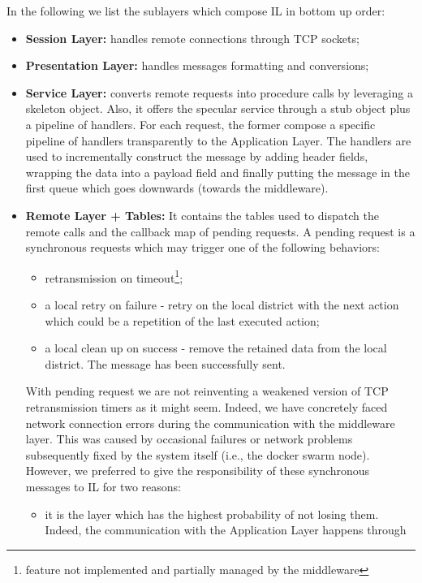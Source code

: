 In the following we list the sublayers which compose IL in
bottom up order:

\begin{itemize}
  \item \textbf{Session Layer:}
  handles remote connections through TCP sockets;
  \item \textbf{Presentation Layer:}
  handles messages formatting and conversions;
  \item \textbf{Service Layer:}
  converts remote requests into procedure calls
  by leveraging a skeleton object.
  Also, it offers the specular service through a stub object plus a pipeline
  of handlers. For each request, the former compose a specific pipeline
  of handlers transparently to the Application Layer.
  The handlers are used to incrementally construct the message by adding
  header fields, wrapping the data into a payload field and finally putting
  the message in the first queue which goes downwards (towards the middleware).
  \item \textbf{Remote Layer + Tables:}
  It contains the tables used
  to dispatch the remote calls and the callback map of pending requests.
  A pending request is a synchronous requests which may trigger one of
  the following behaviors:
  \begin{itemize}
  	\item retransmission on timeout\footnote{feature not implemented and
	  partially managed by the middleware};
  	\item a local retry on failure - retry on the local district with
  	the next action which could be a repetition of the last executed action;
  	\item a local clean up on success - remove the retained data from the local
  	district. The message has been successfully sent.
  \end{itemize}
  With pending request we are not reinventing a weakened version
  of TCP retransmission timers as it might seem.
  Indeed, we have concretely faced network connection errors during
  the communication
  with the middleware layer. This was caused by occasional failures or network
  problems subsequently fixed by the system itself
  (i.e., the docker swarm node).
  However,
  we preferred to give the responsibility of these synchronous messages to IL
  for two reasons:
  \begin{itemize}
  	\item it is the layer which has the highest probability of not losing them.
  	Indeed, the communication with the Application Layer happens through

\end{itemize}
\end{itemize}
